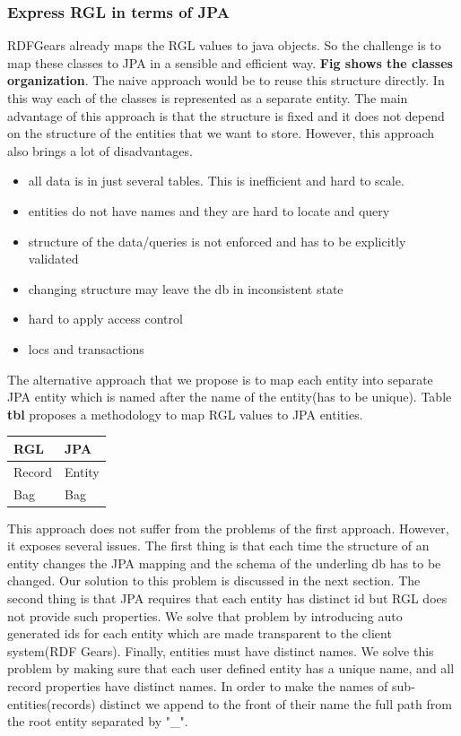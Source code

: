 \documentclass[a4paper, notitlepage]{article}
\begin{document}
\subsubsection{Express RGL in terms of JPA}
RDFGears already maps the RGL values to java objects. So the challenge is to map these classes to JPA in a sensible and efficient way. \textbf{Fig shows the classes organization}. The naive approach would be to reuse this structure directly. In this way each of the classes is represented as a separate entity. The main advantage of this approach is that the structure is fixed and it does not depend on the structure of the entities that we want to store. However, this approach also brings a lot of disadvantages. 

\begin{itemize}
	\item all data is in just several tables. This is inefficient and hard to scale.
	\item entities do not have names and they are hard to locate and query
	\item structure of the data/queries is not enforced and has to be explicitly validated
	\item changing structure may leave the db in inconsistent state
	\item hard to apply access control
	\item locs and transactions
\end{itemize}

The alternative approach that we propose is to map each entity into separate JPA entity which is named after the name of the entity(has to be unique). Table \textbf{tbl} proposes a methodology to map RGL values to JPA entities. 

\begin{center}
    \begin{tabular}{ | l | l |}
    \hline
    RGL & JPA  \\ \hline
    Record & Entity  \\ \hline
    Bag & Bag  \\ \hline

    \end{tabular}
\end{center}

This approach does not suffer from the problems of the first approach. However, it exposes several issues. The first thing is that each time the structure of an entity changes the JPA mapping and the schema of the underling db has to be changed. Our solution to this problem is discussed in the next section. The second thing is that JPA requires that each entity has distinct id but RGL does not provide such properties. We solve that problem by introducing auto generated ids for each entity which are made transparent to the client system(RDF Gears). Finally, entities must have distinct names. We solve this problem by making sure that each user defined entity has a unique name, and all record properties have distinct names. In order to make the names of sub-entities(records) distinct we append to the front of their name the full path from the root entity separated by "\_".
\end{document}

